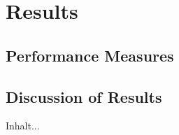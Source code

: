 \chapter{Results} \label{chapter:results}
\section{Performance Measures}
\section{Discussion of Results}	Inhalt...


